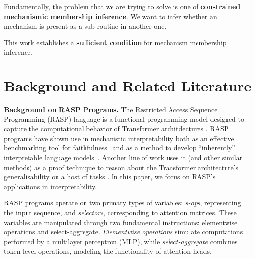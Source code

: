 \documentclass{article}
\begin{document}
Fundamentally, the problem that we are trying to solve is one of \textbf{constrained 
mechanismic membership inference}. We want to infer whether an mechanism 
is present as a sub-routine
in another one. 

This work establishes a \textbf{sufficient condition} for mechanism membership inference.



\section{Background and Related Literature}

\textbf{Background on RASP Programs.} The Restricted Access Sequence Programming (RASP) 
language is a functional programming model designed to capture the computational behavior
of Transformer architdectures
\citep{weiss_thinking_2021}. RASP programs have shown use in mechanistic interpretability both
as an effective benchmarking tool for faithfulness~\citep{conmy_towards_2023,hanna_have_2024}
and as a method to develop ``inherently'' interpretable language
models~\citep{friedman_learning_2023}. Another line of work uses it (and other 
similar methods) as a proof technique to 
reason about the Transformer architecture's generalizability on a host of tasks
\citep{weiss_thinking_2021,merrill_saturated_2022,giannou_looped_2023}. In this paper,
we focus on RASP's applications in interpretability.

RASP programs operate on two primary types of variables: \textit{s-ops}, representing the input
sequence, and \textit{selectors}, corresponding to attention matrices. These variables are
manipulated through two fundamental instructions: elementwise operations and select-aggregate.
\textit{Elementwise operations} simulate computations performed by a multilayer perceptron (MLP), 
while \textit{select-aggregate} combines token-level operations, modeling the 
functionality of attention heads.
\end{document}
